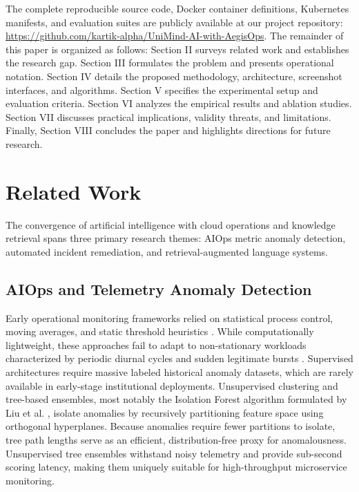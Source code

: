 \documentclass[12pt,onecolumn,draftclsnofoot]{IEEEtran}
\begin{document}
The complete reproducible source code, Docker container definitions, Kubernetes manifests, and evaluation suites are publicly available at our project repository: \url{https://github.com/kartik-alpha/UniMind-AI-with-AegisOps}. The remainder of this paper is organized as follows: Section II surveys related work and establishes the research gap. Section III formulates the problem and presents operational notation. Section IV details the proposed methodology, architecture, screenshot interfaces, and algorithms. Section V specifies the experimental setup and evaluation criteria. Section VI analyzes the empirical results and ablation studies. Section VII discusses practical implications, validity threats, and limitations. Finally, Section VIII concludes the paper and highlights directions for future research.

\section{Related Work}

The convergence of artificial intelligence with cloud operations and knowledge retrieval spans three primary research themes: AIOps metric anomaly detection, automated incident remediation, and retrieval-augmented language systems.

\subsection{AIOps and Telemetry Anomaly Detection}
Early operational monitoring frameworks relied on statistical process control, moving averages, and static threshold heuristics \cite{beyer2016site}. While computationally lightweight, these approaches fail to adapt to non-stationary workloads characterized by periodic diurnal cycles and sudden legitimate bursts \cite{dang2020aiops}. Supervised architectures require massive labeled historical anomaly datasets, which are rarely available in early-stage institutional deployments. Unsupervised clustering and tree-based ensembles, most notably the Isolation Forest algorithm formulated by Liu et al. \cite{liu2008isolation}, isolate anomalies by recursively partitioning feature space using orthogonal hyperplanes. Because anomalies require fewer partitions to isolate, tree path lengths serve as an efficient, distribution-free proxy for anomalousness. Unsupervised tree ensembles withstand noisy telemetry and provide sub-second scoring latency, making them uniquely suitable for high-throughput microservice monitoring.
\end{document}
